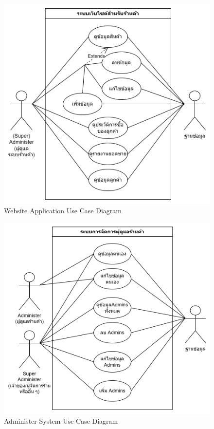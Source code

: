 \begin{figure}[h]
  \begin{center}

    \includegraphics[scale=0.3]{pic/diagram/usecase-web.png}
  \end{center}

  \caption[Website Application Use Case Diagram]{Website Application Use Case Diagram}
  \label{fig:Website Application Use Case Diagram}
\end{figure}
\begin{figure}[h]
  \begin{center}

    \includegraphics[scale=0.3]{pic/diagram/use-case-admin.png}
  \end{center}

  \caption[Administer System Use Case Diagram]{Administer System Use Case Diagram}
  \label{fig:Administer System Use Case Diagram}
\end{figure}

